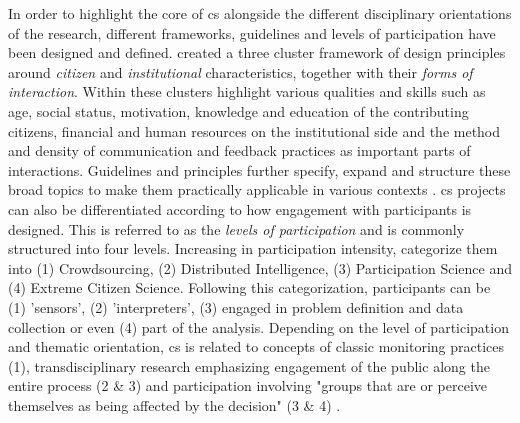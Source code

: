 In order to highlight the core of \acrshort{cs} alongside the different disciplinary orientations of the research, different frameworks, guidelines and levels of participation have been designed and defined. \autocite{kirschkeCitizenScienceProjects2022} created a three cluster framework of design principles around \textit{citizen} and \textit{institutional} characteristics, together with their \textit{forms of interaction}. Within these clusters \autocite{kirschkeCitizenScienceProjects2022} highlight various qualities and skills such as age, social status, motivation, knowledge and education of the contributing citizens, financial and human resources on the institutional side and the method and density of communication and feedback practices as important parts of interactions. Guidelines and principles further specify, expand and structure these broad topics to make them practically applicable in various contexts \autocite{citizenscience.govBasicStepsYour,escaeuropeancitizenscienceassociationTenPrinciplesCitizen2015,escaECSACharacteristicsCitizen2020,EUCitizenScience2023,fraislCitizenScienceEnvironmental2022,garciaFindingWhatYou2021,pocockStrategicFrameworkSupport,skarlatidouWhatVolunteersWant2019}.\newline
\acrlong{cs} projects can also be differentiated according to how engagement with participants is designed. This is referred to as the \textit{levels of participation} and is commonly structured into four levels. Increasing in participation intensity, \autocite{buckinghamshumGlobalParticipatoryPlatform2012} categorize them into (1) Crowdsourcing, (2) Distributed Intelligence, (3) Participation Science and (4) Extreme Citizen Science. Following this categorization, participants can be (1) 'sensors', (2) 'interpreters', (3) engaged in problem definition and data collection or even (4) part of the analysis.\newline
Depending on the level of participation and thematic orientation, \acrshort{cs} is related to concepts of classic monitoring practices (1), transdisciplinary research emphasizing engagement of the public along the entire process (2 \& 3) and participation involving "groups that are or perceive themselves as being affected by the decision" (3 \& 4) \autocites{buckinghamshumGlobalParticipatoryPlatform2012}{conradReviewCitizenScience2011}{minkmanCitizenScienceWater2015}[1]{rennParticipatoryProcessesDesigning2006}.\newline
